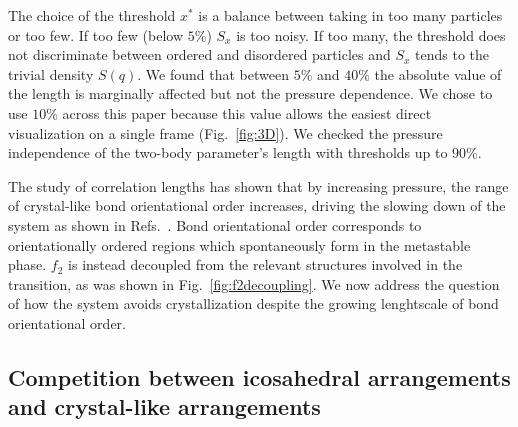 \documentclass[twocolumn,superscriptaddress]{revtex4}
\begin{document}
The choice of the threshold $x^*$ is a balance between taking in too many particles or too few. If too few (below $5\%$) $S_x$ is too noisy. If too many, the threshold does not discriminate between ordered and disordered particles and $S_x$ tends to the trivial density $S(q)$. We found that between $5\%$ and $40\%$ the absolute value of the length is marginally affected but not the pressure dependence. We chose to use $10\%$ across this paper because this value allows the easiest direct visualization on a single frame (Fig.~\ref{fig:3D}). We checked the pressure independence of the two-body parameter's length with thresholds up to $90\%$. 


The study of correlation lengths has shown that by increasing pressure, the range of
crystal-like bond orientational order increases, driving the slowing down of the system as shown in Refs.~\cite{tanaka,mathieu_icosahedra}. 
Bond orientational order corresponds to
orientationally ordered regions which spontaneously form in the metastable phase.
$f_2$ is instead decoupled from the relevant structures involved in the transition, as
was shown in Fig.~\ref{fig:f2decoupling}. We now address the question of how the system avoids crystallization
despite the growing lenghtscale of bond orientational order.


\subsection{Competition between icosahedral arrangements and crystal-like arrangements}\label{sec:icosahedra}
\end{document}
